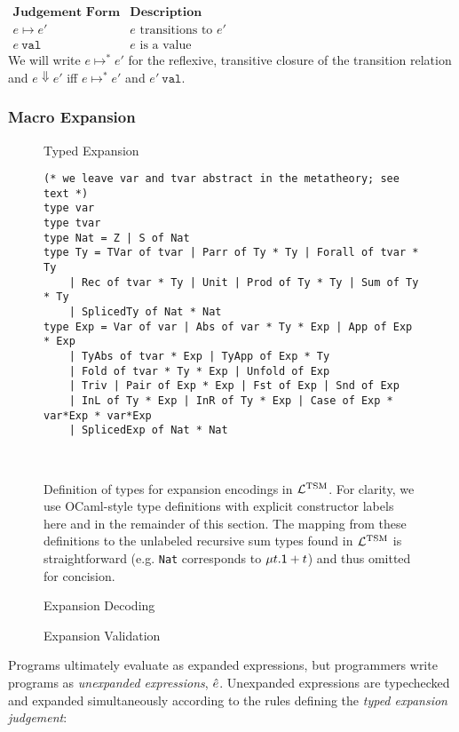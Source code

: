 $\begin{array}{ll}
\textbf{Judgement Form} & \textbf{Description}\\
e \mapsto e' & \text{$e$ transitions to $e'$}\\
e~\mathtt{val} & \text{$e$ is a value}
\end{array}$
\\\noindent
We will write $e \mapsto^* e'$ for the reflexive, transitive closure of the transition relation and $e \Downarrow e'$ iff $e \mapsto^* e'$ and $e'~\mathtt{val}$.

\subsubsection{Macro Expansion}
\begin{figure}
\caption{Typed Expansion}
\label{fig:u-typed-expansion}
\end{figure}
\begin{figure}
\begin{lstlisting}
(* we leave var and tvar abstract in the metatheory; see text *)
type var
type tvar
type Nat = Z | S of Nat
type Ty = TVar of tvar | Parr of Ty * Ty | Forall of tvar * Ty 
	| Rec of tvar * Ty | Unit | Prod of Ty * Ty | Sum of Ty * Ty
	| SplicedTy of Nat * Nat
type Exp = Var of var | Abs of var * Ty * Exp | App of Exp * Exp
	| TyAbs of tvar * Exp | TyApp of Exp * Ty
	| Fold of tvar * Ty * Exp | Unfold of Exp
	| Triv | Pair of Exp * Exp | Fst of Exp | Snd of Exp
	| InL of Ty * Exp | InR of Ty * Exp | Case of Exp * var*Exp * var*Exp
	| SplicedExp of Nat * Nat
\end{lstlisting}
\\
\caption{Definition of types for expansion encodings in $\mathcal{L}^\text{TSM}$. For clarity, we use OCaml-style type definitions with explicit constructor labels here and in the remainder of this section. The mapping from these definitions to the unlabeled recursive sum types found in $\mathcal{L}^\text{TSM}$ is straightforward (e.g. \texttt{Nat} corresponds to $\mu t.\mathsf{1} + t$) and thus omitted for concision.}
\label{fig:visible-compiler}
\end{figure}
\begin{figure}
\caption{Expansion Decoding}
\label{fig:u-expansion-decoding}
\end{figure}
\begin{figure}
\caption{Expansion Validation}
\label{fig:u-expansion-validation}
\end{figure}
Programs ultimately evaluate as expanded expressions, but programmers write programs as \emph{unexpanded expressions}, $\hat{e}$. Unexpanded expressions are typechecked and expanded simultaneously according to the rules defining the \emph{typed expansion judgement}:

